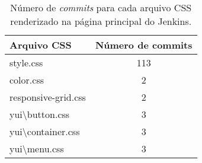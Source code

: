 \begin{table}[!htbp]
	\centering
	\caption{Número de \textit{commits} para cada arquivo CSS renderizado na página principal do Jenkins.}
	\label{tab:commits}
	\begin{tabular}{l|c}
		\textbf{Arquivo CSS} & \textbf{Número de commits} \\ \hline
		style.css            & 113                        \\
		color.css            & 2                          \\
		responsive-grid.css  & 2                          \\
		yui\textbackslash button.css       & 3                          \\
		yui\textbackslash container.css    & 3                          \\
		yui\textbackslash menu.css         & 3                         
	\end{tabular}
\end{table}